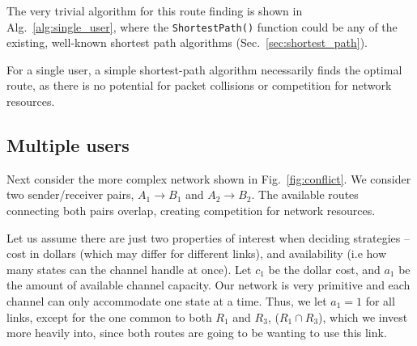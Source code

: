 \documentclass[aps,rmp,twocolumn,amsmath,amssymb,nofootinbib,superscriptaddress,longbibliography,floatfix,table-of-contents,eqsecnum]{revtex4-1}
\begin{document}
The very trivial algorithm for this route finding is shown in Alg.~\ref{alg:single_user}, where the \texttt{ShortestPath()} function could be any of the existing, well-known shortest path algorithms (Sec.~\ref{sec:shortest_path}).
\begin{table}[!htb]
\caption{For a single user, a simple shortest-path algorithm necessarily finds the optimal route, as there is no potential for packet collisions or competition for network resources.} \label{alg:single_user}
\end{table}

%
%

\subsection{Multiple users} \label{sec:two_user} 

Next consider the more complex network shown in Fig.~\ref{fig:conflict}. We consider two sender/receiver pairs, \mbox{$A_1\to B_1$} and \mbox{$A_2\to B_2$}. The available routes connecting both pairs overlap, creating competition for network resources.

Let us assume there are just two properties of interest when deciding strategies -- cost in dollars (which may differ for different links), and availability (i.e how many states can the channel handle at once). Let $c_1$ be the dollar cost, and \mbox{$a_1$} be the amount of available channel capacity. Our network is very primitive and each channel can only accommodate one state at a time. Thus, we let \mbox{$a_1=1$} for all links, except for the one common to both $R_1$ and $R_3$, \mbox{($R_1\cap R_3$)}, which we invest more heavily into, since both routes are going to be wanting to use this link.
\end{document}
